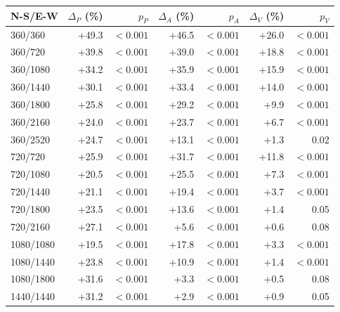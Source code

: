 \begin{table}[!t]
\vspace{6pt}

\begin{tabular}{@{}lrrrrrr@{}}
\toprule
N-S/E-W & $\Delta_P$ (\%) & $p_P$ & $\Delta_A$ (\%) & $p_A$ & $\Delta_V$ (\%) & $p_V$ \\
\midrule
360/360 & +49.3 & $<\!0.001$ & +46.5 & $<\!0.001$ & +26.0 & $<\!0.001$ \\
360/720 & +39.8 & $<\!0.001$ & +39.0 & $<\!0.001$ & +18.8 & $<\!0.001$ \\
360/1080 & +34.2 & $<\!0.001$ & +35.9 & $<\!0.001$ & +15.9 & $<\!0.001$ \\
360/1440 & +30.1 & $<\!0.001$ & +33.4 & $<\!0.001$ & +14.0 & $<\!0.001$ \\
360/1800 & +25.8 & $<\!0.001$ & +29.2 & $<\!0.001$ & +9.9 & $<\!0.001$ \\
360/2160 & +24.0 & $<\!0.001$ & +23.7 & $<\!0.001$ & +6.7 & $<\!0.001$ \\
360/2520 & +24.7 & $<\!0.001$ & +13.1 & $<\!0.001$ & +1.3 & 0.02 \\
720/720 & +25.9 & $<\!0.001$ & +31.7 & $<\!0.001$ & +11.8 & $<\!0.001$ \\
720/1080 & +20.5 & $<\!0.001$ & +25.5 & $<\!0.001$ & +7.3 & $<\!0.001$ \\
720/1440 & +21.1 & $<\!0.001$ & +19.4 & $<\!0.001$ & +3.7 & $<\!0.001$ \\
720/1800 & +23.5 & $<\!0.001$ & +13.6 & $<\!0.001$ & +1.4 & 0.05 \\
720/2160 & +27.1 & $<\!0.001$ & +5.6 & $<\!0.001$ & +0.6 & 0.08 \\
1080/1080 & +19.5 & $<\!0.001$ & +17.8 & $<\!0.001$ & +3.3 & $<\!0.001$ \\
1080/1440 & +23.8 & $<\!0.001$ & +10.9 & $<\!0.001$ & +1.4 & $<\!0.001$ \\
1080/1800 & +31.6 & $<\!0.001$ & +3.3 & $<\!0.001$ & +0.5 & 0.08 \\
1440/1440 & +31.2 & $<\!0.001$ & +2.9 & $<\!0.001$ & +0.9 & 0.05 \\
\bottomrule
\end{tabular}
\end{table}

